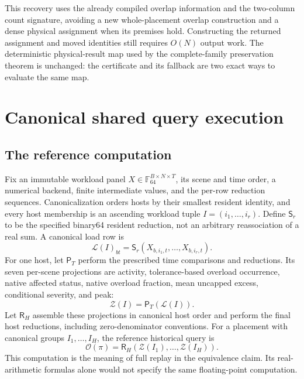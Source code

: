 \documentclass[11pt]{article}
\begin{document}
This recovery uses the already compiled overlap information and the two-column count signature, avoiding a new whole-placement overlap construction and a dense physical assignment when its premises hold. Constructing the returned assignment and moved identities still requires $O(N)$ output work. The deterministic physical-result map used by the complete-family preservation theorem is unchanged: the certificate and its fallback are two exact ways to evaluate the same map.

\section{Canonical shared query execution}
\subsection{The reference computation}
Fix an immutable workload panel $X\in\mathbb F_{64}^{B\times N\times T}$, its scene and time order, a numerical backend, finite intermediate values, and the per-row reduction sequences. Canonicalization orders hosts by their smallest resident identity, and every host membership is an ascending workload tuple $I=(i_1,\ldots,i_r)$. Define $\mathsf S_r$ to be the specified binary64 resident reduction, not an arbitrary reassociation of a real sum. A canonical load row is
\begin{equation}
 \mathcal L(I)_{bt}=\mathsf S_r(X_{b,i_1,t},\ldots,X_{b,i_r,t}).
 \label{eq:canonical-load}
\end{equation}
For one host, let $\mathsf P_T$ perform the prescribed time comparisons and reductions. Its seven per-scene projections are activity, tolerance-based overload occurrence, native affected status, native overload fraction, mean uncapped excess, conditional severity, and peak:
\begin{equation}
 \mathcal Z(I)=\mathsf P_T(\mathcal L(I)).
\end{equation}
Let $\mathsf R_H$ assemble these projections in canonical host order and perform the final host reductions, including zero-denominator conventions. For a placement with canonical groups $I_1,\ldots,I_H$, the reference historical query is
\begin{equation}
 \mathcal O(\pi)=\mathsf R_H(\mathcal Z(I_1),\ldots,\mathcal Z(I_H)).
 \label{eq:query-composition}
\end{equation}
This computation is the meaning of full replay in the equivalence claim. Its real-arithmetic formulas alone would not specify the same floating-point computation.
\end{document}
